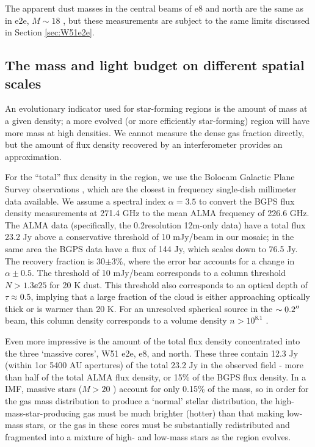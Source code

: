 \documentclass{emulateapj}
\begin{document}
The apparent dust masses in the central beams of e8 and north are the same
as in e2e, $M\sim18$ \msun, but these measurements are subject to the same
limits discussed in Section \ref{sec:W51e2e}.

\subsection{The mass and light budget on different spatial scales}
\label{sec:massbudget}
An evolutionary indicator used for star-forming regions is the amount of mass
at a given density; a more evolved (or more efficiently star-forming) region will
have more mass at high densities.  We cannot measure the dense gas fraction
directly, but the amount of flux density recovered by an interferometer
provides an approximation.

For the ``total'' flux density in the region, we use the Bolocam Galactic Plane
Survey observations \citep{Aguirre2011a,Ginsburg2013a}, which are the closest
in frequency single-dish millimeter data available.  We assume a spectral index
$\alpha=3.5$ to convert the BGPS flux density measurements at 271.4 GHz to the
mean ALMA frequency of 226.6 GHz.  The ALMA data (specifically, the
0.2\arcsec resolution 12m-only data) have a total flux 23.2 Jy above a  conservative
threshold of 10 mJy/beam in our
mosaic; in the same area the BGPS data have a flux of 144 Jy, which scales down to
76.5 Jy.  The recovery fraction is 30$\pm3$\%, where the error bar accounts
for a change in $\alpha\pm0.5$.  The threshold of 10 mJy/beam corresponds to a
column threshold $N>1.3\ee{25}$ \percc for 20 K dust. This threshold also
corresponds to an optical depth of $\tau\approx0.5$, implying that a large
fraction of the cloud is either approaching optically thick or is warmer than 20
K.  For an unresolved spherical source in the $\sim0.2\mbox{$^{\prime\prime}$}$ beam, this
column density corresponds to a volume density $n>10^{8.1}$ \percc.


Even more impressive is the amount of the total flux density concentrated
into the three `massive cores', W51 e2e, e8, and north.  These three contain
12.3 Jy (within 1\arcsec or 5400 AU apertures) of the total 23.2 Jy in the
observed field - more than half of the total ALMA flux density, or 15\% of the
BGPS flux density.  In a \citet{Kroupa2001a} IMF, massive stars ($M>20$ \msun)
account for only 0.15\% of the mass, so in order for the gas mass distribution
to produce a `normal' stellar distribution, the high-mass-star-producing gas
must be much brighter (hotter) than that making low-mass stars, or the gas 
in these cores must be substantially redistributed and fragmented into a
mixture of high- and low-mass stars as the region evolves.
\end{document}
